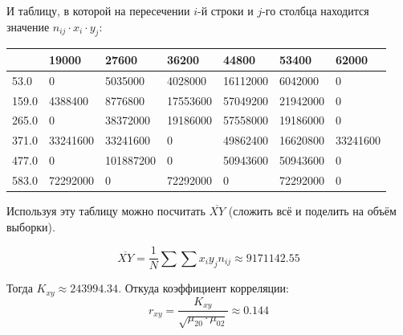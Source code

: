 \documentclass[titlepage]{article}
\begin{document}
И таблицу, в которой на пересечении $i$-й строки и $j$-го столбца находится значение $n_{ij} \cdot x_i \cdot y_j$:

\begin{table}[!ht]
    \centering
    \begin{tabular}{|l|l|l|l|l|l|l|}
    \hline
        ~ & 19000 & 27600 & 36200 & 44800 & 53400 & 62000 \\ \hline
        53.0 & 0 & 5035000 & 4028000 & 16112000 & 6042000 & 0 \\ \hline
        159.0 & 4388400 & 8776800 & 17553600 & 57049200 & 21942000 & 0 \\ \hline
        265.0 & 0 & 38372000 & 19186000 & 57558000 & 19186000 & 0 \\ \hline
        371.0 & 33241600 & 33241600 & 0 & 49862400 & 16620800 & 33241600 \\ \hline
        477.0 & 0 & 101887200 & 0 & 50943600 & 50943600 & 0 \\ \hline
        583.0 & 72292000 & 0 & 72292000 & 0 & 72292000 & 0 \\ \hline
    \end{tabular}
\end{table}

Используя эту таблицу можно посчитать $\overline{XY}$ (сложить всё и поделить на объём выборки).

\begin{equation*}
\overline{XY} = \frac{1}{N} \sum \sum x_i y_j n_{ij} \approx 9171142.55
\end{equation*}

Тогда $K_{xy} \approx 243994.34$. Откуда коэффициент корреляции:
\begin{equation*}
r_{xy} = \frac{K_{xy} }{ \sqrt{\mu_{20} \cdot \mu_{02} } } \approx 0.144
\end{equation*}

\clearpage
\appendix
\end{document}
